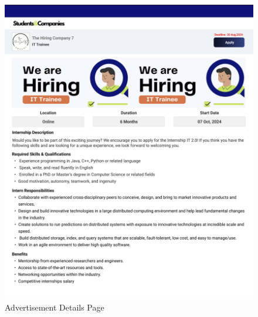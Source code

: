 \documentclass{article}
\begin{document}
\begin{figure}[H]
    \centering
    \includegraphics[scale = 0.65]{figures/UserInterfaces/Student/AdvertisementPage.png}
    \caption{Advertisement Details Page}
     \centering
\end{figure}
\end{document}
